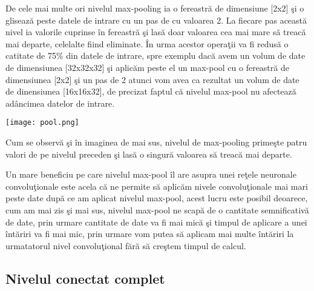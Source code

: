 \par

De cele mai multe ori nivelul max-pooling ia o fereastr\u{a} de dimensiune [2x2] \c{s}i o gliseaz\u{a} peste datele de intrare cu un pas de cu valoarea 2. La fiecare pas aceast\u{a} nivel ia valorile cuprinse \^{i}n fereastr\u{a} \c{s}i las\u{a} doar valoarea cea mai mare s\u{a} treac\u{a} mai departe, celelalte fiind eliminate. \^{I}n urma acestor opera\c{t}ii va fi redus\u{a} o catitate de 75\% din datele de intrare, spre exemplu dac\u{a} avem un volum de date de dimensiunea [32x32x32] \c{s}i aplic\u{a}m peste el un max-pool cu o fereastr\u{a} de dimensiunea [2x2] \c{s}i un pas de 2 atunci vom avea ca rezultat un volum de date de dinensiunea [16x16x32], de precizat faptul c\u{a} nivelul max-pool nu afecteaz\u{a} ad\^{a}ncimea datelor de intrare.

\begin{center}
\texttt{[image: pool.png]}
\end{center}

Cum se observ\u{a} \c{s}i \^{i}n imaginea de mai sus, nivelul de max-pooling prime\c{s}te patru valori de pe nivelul preceden \c{s}i las\u{a} o singur\u{a} valoarea s\u{a} treac\u{a} mai departe.

Un mare beneficiu pe care nivelul max-pool \^{i}l are asupra unei re\c{t}ele neuronale convolu\c{t}ionale este acela c\u{a} ne permite s\u{a} aplic\u{a}m nivele convolu\c{t}ionale mai mari peste date dup\u{a} ce am aplicat nivelul max-pool, acest lucru este posibil deoarece, cum am mai zis \c{s}i mai sus, nivelul max-pool ne scap\u{a} de o cantitate semnificativ\u{a} de date, prin urmare cantitate de date va fi mai mic\u{a} \c{s}i timpul de aplicare a unei \^{i}nt\u{a}riri va fi mai mic, prin urmare vom putea s\u{a} aplicam mai multe \^{i}nt\u{a}riri la urmatatorul nivel convolu\c{t}ional f\u{a}r\u{a} s\u{a} cre\c{s}tem timpul de calcul.

\subsection{Nivelul conectat complet}